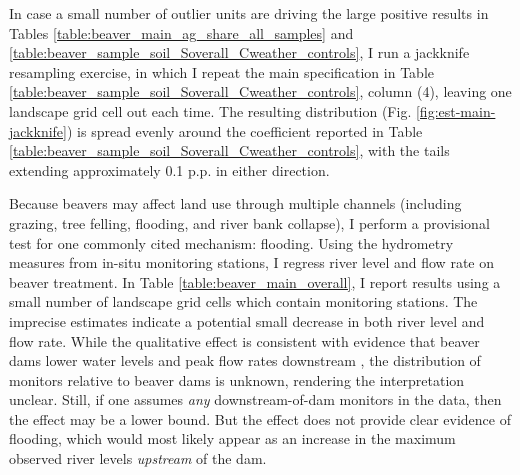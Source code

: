 In case a small number of outlier units are driving the large positive results in Tables \ref{table:beaver_main_ag_share_all_samples} and \ref{table:beaver_sample_soil_Soverall_Cweather_controls}, I run a jackknife resampling exercise, in which I repeat the main specification in Table \ref{table:beaver_sample_soil_Soverall_Cweather_controls}, column (4), leaving one landscape grid cell out each time. The resulting distribution (Fig. \ref{fig:est-main-jackknife}) is spread evenly around the coefficient reported in Table \ref{table:beaver_sample_soil_Soverall_Cweather_controls}, with the tails extending approximately 0.1 p.p. in either direction. 

Because beavers may affect land use through multiple channels (including grazing, tree felling, flooding, and river bank collapse), I perform a provisional test for one commonly cited mechanism: flooding. Using the hydrometry measures from in-situ monitoring stations, I regress river level and flow rate on beaver treatment. In Table \ref{table:beaver_main_overall}, I report results using a small number of landscape grid cells which contain monitoring stations. The imprecise estimates indicate a potential small decrease in both river level and flow rate. While the qualitative effect is consistent with evidence that beaver dams lower water levels and peak flow rates downstream \citep{swinnen_environmental_2019}, the distribution of monitors relative to beaver dams is unknown, rendering the interpretation unclear. Still, if one assumes \textit{any} downstream-of-dam monitors in the data, then the effect may be a lower bound. But the effect does not provide clear evidence of flooding, which would most likely appear as an increase in the maximum observed river levels \textit{upstream} of the dam. 

